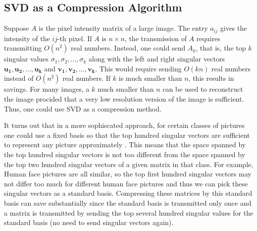 \subsection{SVD as a Compression Algorithm}
Suppose \(A\) is the pixel intensity matrix of a large image. The entry \(a_{ij} \) gives the intensity of the \(ij\)-th pixel. If \(A\) is \(n \times n\), the transmission of \(A\) requires transmitting \(O \left( n^2 \right) \) real numbers. Instead, one could send \(A_k\), that is, the top \(k\) singular values  \(\sigma _1, \sigma _2, \dots , \sigma _k\) along with the left and right singular vectors \(\mathbf{u_1}, \mathbf{u_2}, \dots , \mathbf{u_k}   \) and \(\mathbf{v_1}, \mathbf{v_2}, \dots , \mathbf{v_k}\). This would require sending \(O(kn)\) real numbers instead of \(O(n^2)\) real numbers. If \(k\) is much smaller than \(n\), this results in savings. For many images, a \(k\) much smaller than \(n\) can be used to reconstruct the image procided that a very low resolution version of the image is sufficient. Thus, one could use SVD as a compression method.

It turns out that in a more sophiscated approach, for certain classes of pictures one could use a fixed basis so that the top hundred singular vectors are sufficient to represent any picture approximately . This means that the space spanned by the top hundred singular vectors is not too different from the space spanned by the top two hundred singular vectors of a given matrix in that class. For example, Human face pictures are all similar, so the top first hundred singular vectors may not differ too much for different human face pictures and thus we can pick these singular vectors as a standard basis. Compressing these matrices by this standard basis can save substantially since the standard basis is transmitted only once and a matrix is transmitted by sending the top several hundred singular values for the standard basis (no need to send singular vectors again).

